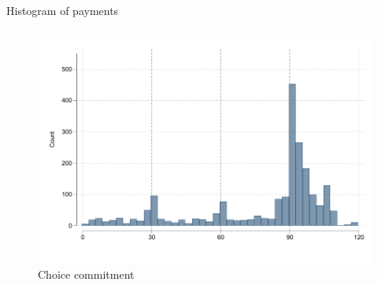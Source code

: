 \documentclass[8pt]{beamer}
\begin{document}
\begin{frame}{Histogram of payments}
\begin{columns}
\begin{column}{.33\textwidth}
    \begin{figure}[H]
    \caption{Choice commitment}
    \begin{center}
        \includegraphics[width=\textwidth]{Figuras/hist_payments_cc.pdf}
    \end{center}
\end{figure}
\end{column}
\end{columns}

\end{frame}


    





 
\end{document}

